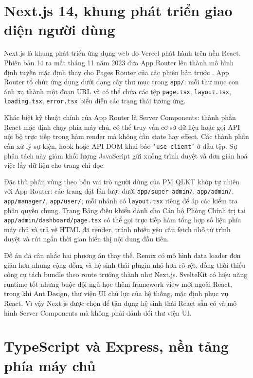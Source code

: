 \documentclass[../DoAn.tex]{subfiles}
\begin{document}
\section{Next.js 14, khung phát triển giao diện người dùng}
\label{section:3.1}

Next.js là khung phát triển ứng dụng web do Vercel phát hành trên nền React. Phiên bản 14 ra mắt tháng 11 năm 2023 đưa App Router lên thành mô hình định tuyến mặc định thay cho Pages Router của các phiên bản trước \cite{nextjsdocs}. App Router tổ chức ứng dụng dưới dạng cây thư mục trong \texttt{app/}: mỗi thư mục con ánh xạ thành một đoạn URL và có thể chứa các tệp \texttt{page.tsx}, \texttt{layout.tsx}, \texttt{loading.tsx}, \texttt{error.tsx} biểu diễn các trạng thái tương ứng.

Khác biệt kỹ thuật chính của App Router là Server Components: thành phần React mặc định chạy phía máy chủ, có thể truy vấn cơ sở dữ liệu hoặc gọi API nội bộ trực tiếp trong hàm render mà không cần state hay effect. Các thành phần cần xử lý sự kiện, hook hoặc API DOM khai báo \texttt{'use client'} ở đầu tệp. Sự phân tách này giảm khối lượng JavaScript gửi xuống trình duyệt và đơn giản hoá việc lấy dữ liệu cho trang chỉ đọc.

Đặc thù phân vùng theo bốn vai trò người dùng của PM QLKT khớp tự nhiên với App Router: các trang đặt lần lượt dưới \texttt{app/super-admin/}, \texttt{app/admin/}, \texttt{app/manager/}, \texttt{app/user/}; mỗi nhánh có \texttt{layout.tsx} riêng để áp các kiểm tra phân quyền chung. Trang Bảng điều khiển dành cho Cán bộ Phòng Chính trị tại \texttt{app/admin/dashboard/page.tsx} có thể gọi trực tiếp hàm tổng hợp số liệu phía máy chủ và trả về HTML đã render, tránh nhiều yêu cầu fetch nhỏ từ trình duyệt và rút ngắn thời gian hiển thị nội dung đầu tiên.

Đồ án đã cân nhắc hai phương án thay thế. Remix có mô hình data loader đơn giản hơn nhưng cộng đồng và hệ sinh thái plugin nhỏ hơn rõ rệt, đồng thời thiếu công cụ tách bundle theo route trưởng thành như Next.js. SvelteKit có hiệu năng runtime tốt nhưng buộc đội ngũ học thêm framework view mới ngoài React, trong khi Ant Design, thư viện UI chủ lực của hệ thống, mặc định phục vụ React. Vì vậy Next.js được chọn để tận dụng hệ sinh thái React sẵn có và mô hình Server Components mà không phải đánh đổi thư viện UI.

\section{TypeScript và Express, nền tảng phía máy chủ}
\label{section:3.2}
\end{document}
